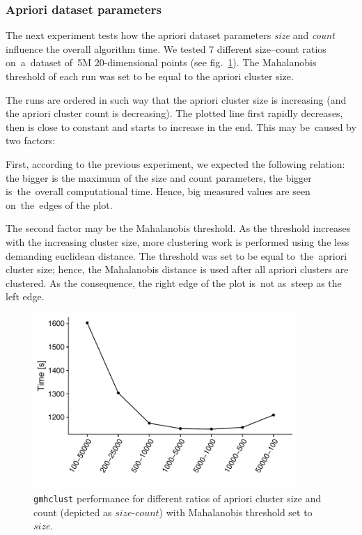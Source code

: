 \subsubsection{Apriori dataset parameters}

The next experiment tests how the apriori dataset parameters \emph{size} and \emph{count} influence the overall algorithm time. We tested 7 different size--count ratios on~a~dataset of~5M 20-dimensional points (see fig.~\ref{fig04:apr_ratio}). The Mahalanobis threshold of each run was set to be equal to the apriori cluster size.

The runs are ordered in such way that the apriori cluster size is increasing (and the apriori cluster count is decreasing). The plotted line first rapidly decreases, then is close to constant and starts to increase in the end. This may be~caused by two factors:

First, according to the previous experiment, we expected the following relation: the bigger is the maximum of the size and count parameters, the bigger is~the~overall computational time. Hence, big measured values are seen on~the~edges of the plot. 

The second factor may be the Mahalanobis threshold. As the threshold increases with the increasing cluster size, more clustering work is performed using the less demanding euclidean distance. The threshold was set to be equal to~the~apriori cluster size; hence, the Mahalanobis distance is used after all apriori clusters are clustered. As the consequence, the right edge of the plot is~not as~steep as the left edge.

\begin{figure}\centering
	\includegraphics[width=10cm]{img/5M-compare}
	\caption{\texttt{gmhclust} performance for different ratios of apriori cluster size and count (depicted as $size$-$count$) with Mahalanobis threshold set to $size$.}
	\label{fig04:apr_ratio}
\end{figure}

